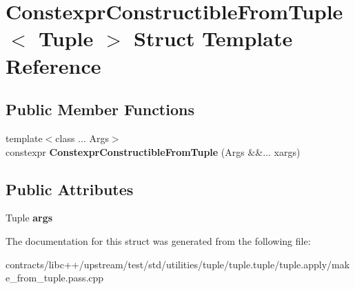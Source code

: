 \hypertarget{struct_constexpr_constructible_from_tuple}{}\section{Constexpr\+Constructible\+From\+Tuple$<$ Tuple $>$ Struct Template Reference}
\label{struct_constexpr_constructible_from_tuple}
\subsection*{Public Member Functions}
\begin{DoxyCompactItemize}
\item 
\mbox{\label{struct_constexpr_constructible_from_tuple_a77e3734c170913501fa6becd914b109d}} 
{\footnotesize template$<$class ... Args$>$ }\\constexpr {\bfseries Constexpr\+Constructible\+From\+Tuple} (Args \&\&... xargs)
\end{DoxyCompactItemize}
\subsection*{Public Attributes}
\begin{DoxyCompactItemize}
\item 
\mbox{\label{struct_constexpr_constructible_from_tuple_a1623e15f45938d7ca329b17274a637a6}} 
Tuple {\bfseries args}
\end{DoxyCompactItemize}


The documentation for this struct was generated from the following file\+:\begin{DoxyCompactItemize}
\item 
contracts/libc++/upstream/test/std/utilities/tuple/tuple.\+tuple/tuple.\+apply/make\+\_\+from\+\_\+tuple.\+pass.\+cpp\end{DoxyCompactItemize}
